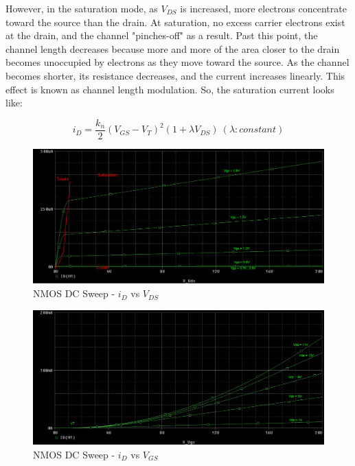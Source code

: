 However, in the saturation mode, as $V_{DS}$ is increased, more electrons concentrate toward the source than the drain. At saturation, no excess carrier electrons exist at the drain, and the channel "pinches-off" as a result. Past this point, the channel length decreases because more and more of the area closer to the drain becomes unoccupied by electrons as they move toward the source. As the channel becomes shorter, its resistance decreases, and the current increases linearly. This effect is known as channel length modulation. So, the saturation current looks like:

\begin{equation}
	\label{eq:sat_current_clm}
	i_D = \frac{k_n}{2} ( V_{GS} - V_{T} )^2 ( 1 + \lambda V_{DS} ) \ ( \lambda: constant )
\end{equation}

\FloatBarrier

\begin{figure}[h!]
	\centering
	\includegraphics[scale=0.25]{./images/circuit1_vds_sweep.PNG}
	\caption{NMOS DC Sweep - $i_D$ vs $V_{DS}$}
	\label{fig:circuit1_vds_sweep}
\end{figure}

\FloatBarrier

\FloatBarrier

\begin{figure}[h!]
	\centering
	\includegraphics[scale=0.5]{./images/circuit1_full_sweep.PNG}
	\caption{NMOS DC Sweep - $i_D$ vs $V_{GS}$}
	\label{fig:circuit1_full_sweep}
\end{figure}

